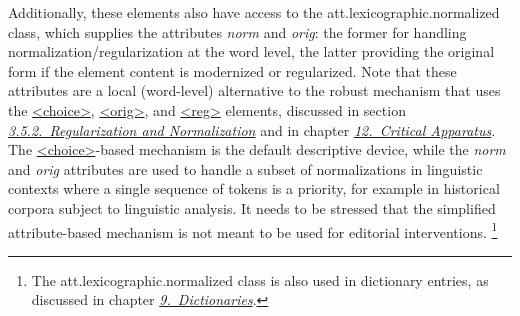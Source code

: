 \par
Additionally, these elements also have access to the \textsf{att.lexicographic.normalized} class, which supplies the attributes {\itshape norm} and {\itshape orig}: the former for handling normalization/regularization at the word level, the latter providing the original form if the element content is modernized or regularized. Note that these attributes are a local (word-level) alternative to the robust mechanism that uses the \hyperref[TEI.choice]{<choice>}, \hyperref[TEI.orig]{<orig>}, and \hyperref[TEI.reg]{<reg>} elements, discussed in section \textit{\hyperref[COEDREG]{3.5.2.\ Regularization and Normalization}} and in chapter \textit{\hyperref[TC]{12.\ Critical Apparatus}}. The \hyperref[TEI.choice]{<choice>}-based mechanism is the default descriptive device, while the {\itshape norm} and {\itshape orig} attributes are used to handle a subset of normalizations in linguistic contexts where a single sequence of tokens is a priority, for example in historical corpora subject to linguistic analysis. It needs to be stressed that the simplified attribute-based mechanism is not meant to be used for editorial interventions. \footnote{The \textsf{att.lexicographic.normalized} class is also used in dictionary entries, as discussed in chapter \textit{\hyperref[DI]{9.\ Dictionaries}}.}\par
